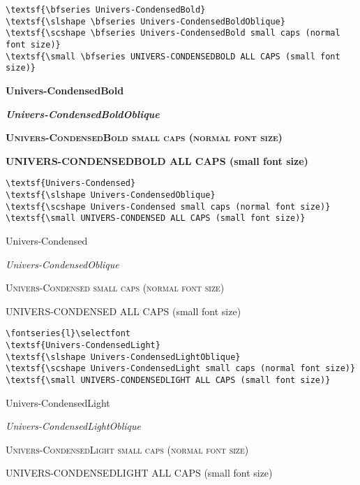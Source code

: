 \documentclass{article}
\begin{document}
\renewcommand\sfdefault{fun}

\begin{verbatim}
\textsf{\bfseries Univers-CondensedBold}
\textsf{\slshape \bfseries Univers-CondensedBoldOblique}
\textsf{\scshape \bfseries Univers-CondensedBold small caps (normal font size)}
\textsf{\small \bfseries UNIVERS-CONDENSEDBOLD ALL CAPS (small font size)}
\end{verbatim}

\textsf{\bfseries Univers-CondensedBold}

\textsf{\slshape \bfseries Univers-CondensedBoldOblique}

\textsf{\scshape \bfseries Univers-CondensedBold small caps (normal font size)}

\textsf{\small \bfseries UNIVERS-CONDENSEDBOLD ALL CAPS (small font size)}

\rule[0in]{0in}{0.25in}
\begin{verbatim}
\textsf{Univers-Condensed}
\textsf{\slshape Univers-CondensedOblique}
\textsf{\scshape Univers-Condensed small caps (normal font size)}
\textsf{\small UNIVERS-CONDENSED ALL CAPS (small font size)}
\end{verbatim}

\textsf{Univers-Condensed}

\textsf{\slshape Univers-CondensedOblique}

\textsf{\scshape Univers-Condensed small caps (normal font size)}

\textsf{\small UNIVERS-CONDENSED ALL CAPS (small font size)}

\rule[0in]{0in}{0.25in}
\begin{verbatim}
\fontseries{l}\selectfont
\textsf{Univers-CondensedLight}
\textsf{\slshape Univers-CondensedLightOblique}
\textsf{\scshape Univers-CondensedLight small caps (normal font size)}
\textsf{\small UNIVERS-CONDENSEDLIGHT ALL CAPS (small font size)}
\end{verbatim}

\selectfont

\textsf{Univers-CondensedLight}

\textsf{\slshape Univers-CondensedLightOblique}

\textsf{\scshape Univers-CondensedLight small caps (normal font size)}

\textsf{\small UNIVERS-CONDENSEDLIGHT ALL CAPS (small font size)}
\end{document}
